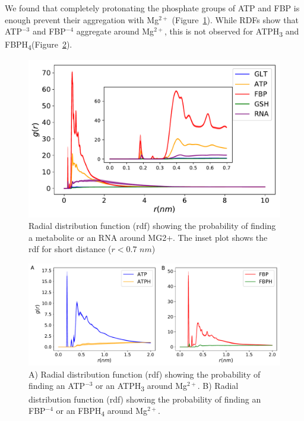 \documentclass[journal=jacsat,manuscript=article]{achemso}
\begin{document}
We found that completely protonating the phosphate groups of ATP and FBP is enough prevent their aggregation with Mg$^{2+}$ (Figure~\ref{fig:avoiding_aggregation}). While RDFs show that ATP$^{-3}$ and FBP$^{-4}$ aggregate around Mg$^{2+}$, this is not observed for ATPH\textsubscript{3} and FBPH\textsubscript{4}(Figure~\ref{fig:protonation}).

\begin{figure}[H]
\includegraphics[scale=0.5]{rdf_mg.pdf}
\caption{Radial distribution function (rdf) showing the probability of finding a metabolite or an RNA around MG2+. The inset plot shows the rdf for short distance ($ r < 0.7 \,\, nm$)}
\label{fig:avoiding_aggregation}
\end{figure}


\begin{figure}[H]
\includegraphics[scale=0.5]{rdf_mg_metabolites.pdf}
\caption{A) Radial distribution function (rdf) showing the probability of finding an ATP$^{-3}$ or an ATPH\textsubscript{3} around Mg$^{2+}$. B) Radial distribution function (rdf) showing the probability of finding an FBP$^{-4}$ or an FBPH\textsubscript{4} around Mg$^{2+}$. }
\label{fig:protonation}
\end{figure}
\end{document}
